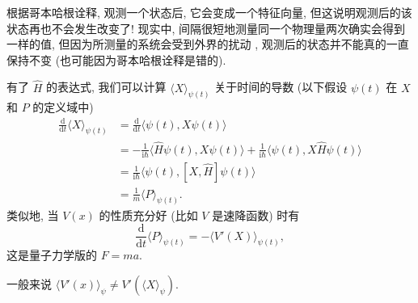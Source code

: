 \begin{remark}
    根据哥本哈根诠释, 观测一个状态后, 它会变成一个特征向量, 但这说明观测后的该状态再也不会发生改变了! 现实中, 间隔很短地测量同一个物理量两次确实会得到一样的值, 但因为所测量的系统会受到外界的扰动 , 观测后的状态并不能真的一直保持不变 (也可能因为哥本哈根诠释是错的).
\end{remark}

有了 $\hat{H}$ 的表达式, 我们可以计算 $\langle X \rangle_{\psi(t)}$ 关于时间的导数 (以下假设 $\psi(t)$ 在 $X$ 和 $P$ 的定义域中)
\begin{align*}
    \frac{\mathrm{d} }{\mathrm{d} t}\langle X \rangle_{\psi(t)}&=\frac{\mathrm{d} }{\mathrm{d} t}\langle \psi(t),X\psi(t) \rangle\\
    &= -\frac{1}{\mathrm{i}\hbar}\langle \hat{H}\psi(t),X\psi(t) \rangle+\frac{1}{\mathrm{i}\hbar}\langle \psi(t),X\hat{H}\psi(t) \rangle \\
    &= \frac{1}{\mathrm{i}\hbar}\langle \psi(t),[X,\hat{H}]\psi(t) \rangle\\
    &= \frac{1}{m}\langle P \rangle_{\psi(t)}.
\end{align*}
类似地, 当 $V(x)$ 的性质充分好 (比如 $V$ 是速降函数) 时有
\[ \frac{\mathrm{d} }{\mathrm{d} t}\langle P \rangle_{\psi(t)}=-\langle V'(X) \rangle_{\psi(t)}, \] 
这是量子力学版的 $F=ma$.
\begin{remark}
    一般来说 $\langle V'(x) \rangle_\psi\neq V'(\langle X \rangle_\psi)$.
\end{remark}